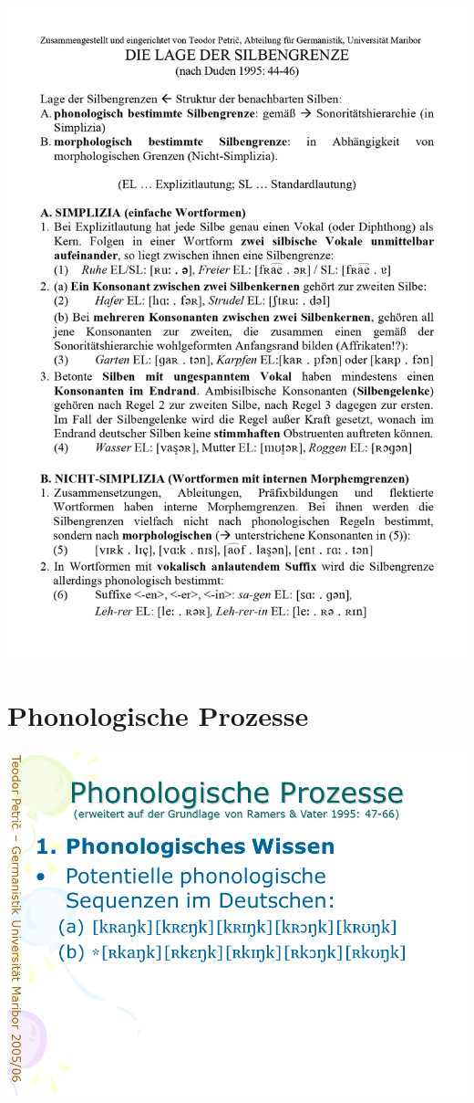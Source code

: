 \documentclass[
  letterpaper,
]{scrbook}
\begin{document}
\includegraphics[width=1\textwidth,height=\textheight]{./pictures/04_Die_Lage_der_Silbengrenze_page-0001.jpg}

\hypertarget{sec-prozesse}{%
\chapter{Phonologische Prozesse}\label{sec-prozesse}}

\includegraphics[width=1\textwidth,height=\textheight]{./pictures/prozesse/prozesse_2.PNG}
\end{document}
